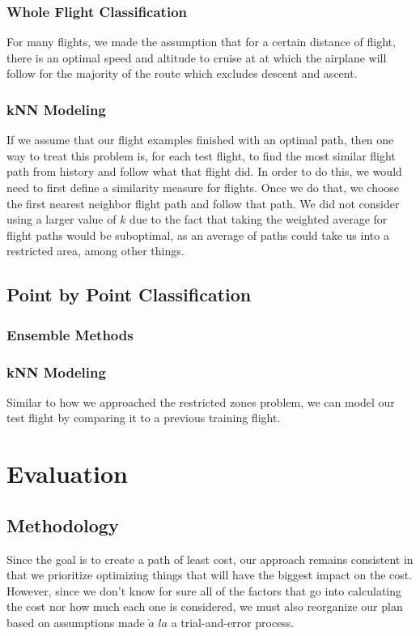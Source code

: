 \documentclass{article}[12pt]
\begin{document}
\begin{multicols}{2}
\subsubsection{Whole Flight Classification}
For many flights, we made the assumption that for a certain distance of flight, there is an optimal speed and altitude to cruise at at which the airplane will follow for the majority of the route which excludes descent and ascent. 
\subsubsection{kNN Modeling}

If we assume that our flight examples finished with an optimal path, then one way to treat this problem is, for each test flight, to find the most similar flight path from history and follow what that flight did. In order to do this, we would need to first define a similarity measure for flights. Once we do that, we choose the first nearest neighbor flight path and follow that path. We did not consider using a larger value of $k$ due to the fact that taking the weighted average for flight paths would be suboptimal, as an average of paths could take us into a restricted area, among other things.


\subsection{Point by Point Classification}




\subsubsection{Ensemble Methods}
\subsubsection{kNN Modeling}

Similar to how we approached the restricted zones problem, we can model our test flight by comparing it to a previous training flight. 

\section{Evaluation}
\subsection{Methodology}
Since the goal is to create a path of least cost, our approach remains consistent in that we prioritize optimizing things that will have the biggest impact on the cost. However, since we don't know for sure all of the factors that go into calculating the cost nor how much each one is considered, we must also reorganize our plan based on assumptions made $\grave{a}$ $la$ a trial-and-error process.


\end{multicols}
\end{document}
